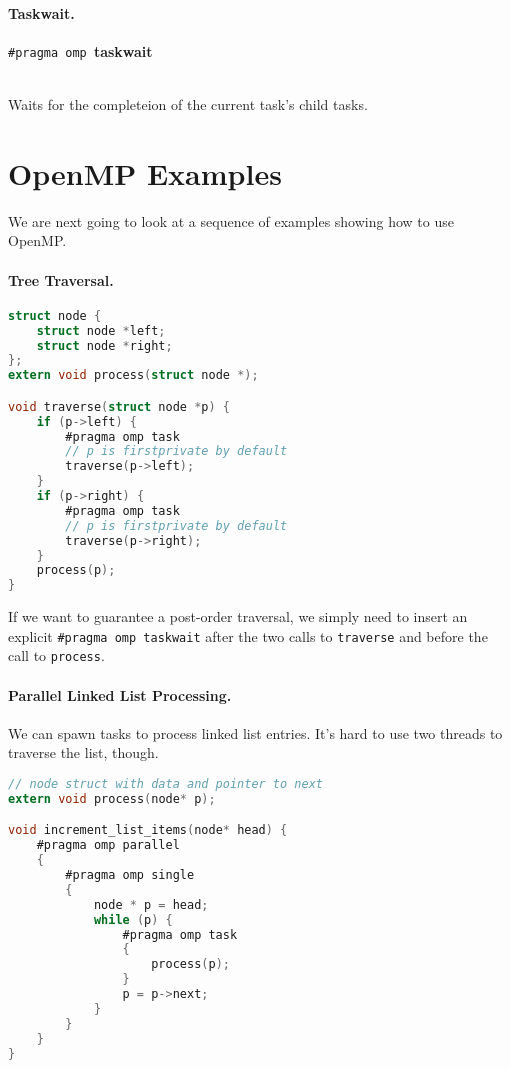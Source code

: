 \paragraph{Taskwait.}
  \begin{center}
    {\tt \#pragma omp }{\bf taskwait}
  \end{center}~\\[1em]

     Waits for the completeion of the current task's child tasks.

\section*{OpenMP Examples}
We are next going to look at a sequence of examples showing
how to use OpenMP.

\paragraph{Tree Traversal.}
  \begin{lstlisting}[language=C]
struct node {
    struct node *left;
    struct node *right;
};
extern void process(struct node *);

void traverse(struct node *p) {
    if (p->left) {
        #pragma omp task
        // p is firstprivate by default
        traverse(p->left);
    }
    if (p->right) {
        #pragma omp task
        // p is firstprivate by default
        traverse(p->right);
    }
    process(p);
}    
  \end{lstlisting}

If we want to guarantee a post-order traversal,
we simply need to insert an explicit \verb+#pragma omp taskwait+
after the two calls to {\tt traverse} and before the
call to {\tt process}.


\paragraph{Parallel Linked List Processing.} We can spawn 
tasks to process linked list entries. It's hard to
use two threads to traverse the list, though.

  \begin{lstlisting}[language=C]
// node struct with data and pointer to next
extern void process(node* p);

void increment_list_items(node* head) {
    #pragma omp parallel
    {
        #pragma omp single
        {
            node * p = head;
            while (p) {
                #pragma omp task
                {
                    process(p);
                }
                p = p->next;
            }
        }
    }
}
  \end{lstlisting}

